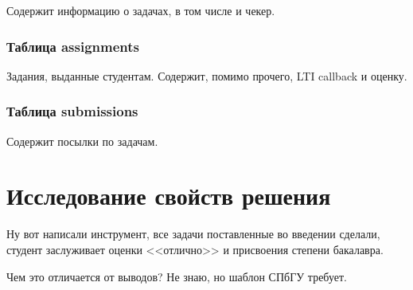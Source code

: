 \documentclass[a4paper,article,14pt]{extarticle}
\begin{document}
Содержит информацию о задачах, в том числе и чекер.

\subsubsection{Таблица assignments}

Задания, выданные студентам. Содержит, помимо прочего, LTI callback и оценку.

\subsubsection{Таблица submissions}

Содержит посылки по задачам.

\section{Исследование свойств решения}


Ну вот написали инструмент, все задачи поставленные во введении сделали, студент заслуживает оценки <<отлично>> и присвоения степени бакалавра.


Чем это отличается от выводов? Не знаю, но шаблон СПбГУ требует.

\begin{thebibliography}{1}
\end{thebibliography}
\end{document}
